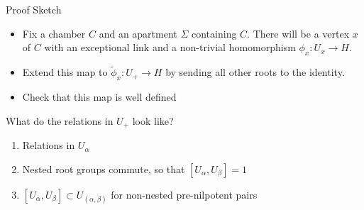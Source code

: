\documentclass[xcolor=dvipsnames]{beamer}
\theoremstyle{definition}
\begin{document}
\begin{frame}{Proof Sketch}
	\begin{itemize}
		\item Fix a chamber $C$ and an apartment $\Sigma$ containing $C.$ There will be a vertex $x$ of $C$ with an exceptional link and a non-trivial homomorphism $\phi_x:U_x\to H.$
			\pause
		\item Extend this map to $\tilde{\phi}_x:U_+\to H$ by sending all other roots to the identity.
			\pause
		\item Check that this map is well defined
	\end{itemize}
	\pause
	What do the relations in $U_+$ look like?
	\begin{enumerate}
		\pause
	\item Relations in $U_\alpha$
		\pause 
	\item Nested root groups commute, so that $[U_\alpha,U_\beta]=1$
		\pause
	\item $[U_\alpha,U_\beta]\subset U_{(\alpha,\beta)}$ for non-nested pre-nilpotent pairs
	\end{enumerate}
\end{frame}
\end{document}
